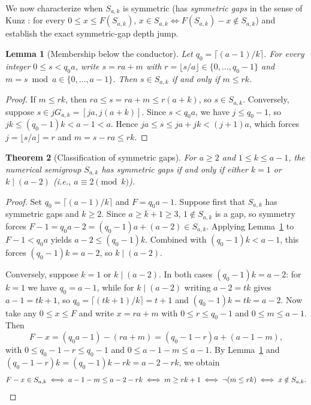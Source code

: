 \documentclass[11pt]{amsart}
\newtheorem{theorem}{Theorem}[section]
\newtheorem{lemma}[theorem]{Lemma}
\theoremstyle{definition}
\theoremstyle{remark}
\begin{document}
We now characterize when $S_{a,k}$ is symmetric (has \emph{symmetric gaps} in the sense of Kunz \cite{Kunz1970}: for every $0 \le x \le F(S_{a,k})$, $x \in S_{a,k} \iff F(S_{a,k}) - x \notin S_{a,k}$) and establish the exact symmetric-gap depth jump.

\begin{lemma}[Membership below the conductor]
\label{lem:below-cond}
Let $q_0 = \lceil (a-1)/k \rceil$. For every integer $0 \le s < q_0 a$, write $s = ra + m$ with $r = \lfloor s/a \rfloor \in \{0, \dots, q_0 - 1\}$ and $m = s \bmod a \in \{0, \dots, a-1\}$. Then $s \in S_{a,k}$ if and only if $m \le rk$.
\end{lemma}

\begin{proof}
If $m \le rk$, then $ra \le s = ra + m \le r(a+k)$, so $s \in S_{a,k}$. Conversely, suppose $s \in j G_{a,k} = [ja, j(a+k)]$. Since $s < q_0 a$, we have $j \le q_0 - 1$, so $jk \le (q_0 - 1)k < a - 1 < a$. Hence $ja \le s \le ja + jk < (j+1)a$, which forces $j = \lfloor s/a \rfloor = r$ and $m = s - ra \le rk$.
\end{proof}

\begin{theorem}[Classification of symmetric gaps]
\label{thm:symmetric-iff}
For $a \ge 2$ and $1 \le k \le a-1$, the numerical semigroup $S_{a,k}$ has symmetric gaps if and only if either $k = 1$ or $k \mid (a - 2)$ (i.e., $a \equiv 2 \pmod{k}$).
\end{theorem}

\begin{proof}
Set $q_0 = \lceil (a-1)/k \rceil$ and $F = q_0 a - 1$. Suppose first that $S_{a,k}$ has symmetric gaps and $k \ge 2$. Since $a \ge k + 1 \ge 3$, $1 \notin S_{a,k}$ is a gap, so symmetry forces $F - 1 = q_0 a - 2 = (q_0 - 1)a + (a - 2) \in S_{a,k}$. Applying Lemma~\ref{lem:below-cond} to $F - 1 < q_0 a$ yields $a - 2 \le (q_0 - 1)k$. Combined with $(q_0 - 1)k < a - 1$, this forces $(q_0 - 1)k = a - 2$, so $k \mid (a - 2)$.

Conversely, suppose $k = 1$ or $k \mid (a - 2)$. In both cases $(q_0 - 1)k = a - 2$: for $k = 1$ we have $q_0 = a - 1$, while for $k \mid (a - 2)$ writing $a - 2 = tk$ gives $a - 1 = tk + 1$, so $q_0 = \lceil (tk+1)/k \rceil = t + 1$ and $(q_0 - 1)k = tk = a - 2$. Now take any $0 \le x \le F$ and write $x = ra + m$ with $0 \le r \le q_0 - 1$ and $0 \le m \le a - 1$. Then
\[
  F - x = (q_0 a - 1) - (ra + m) = (q_0 - 1 - r)a + (a - 1 - m),
\]
with $0 \le q_0 - 1 - r \le q_0 - 1$ and $0 \le a - 1 - m \le a - 1$. By Lemma~\ref{lem:below-cond} and $(q_0 - 1 - r)k = (q_0 - 1)k - rk = a - 2 - rk$, we obtain
\[
  F - x \in S_{a,k} \iff a - 1 - m \le a - 2 - rk \iff m \ge rk + 1 \iff \neg(m \le rk) \iff x \notin S_{a,k}. \qedhere
\]
\end{proof}
\end{document}
